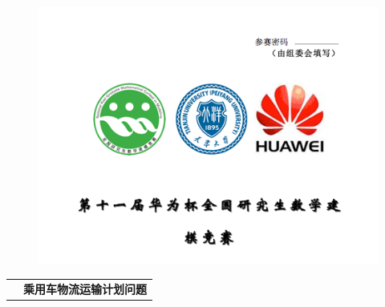 \documentclass[UTF8，12pt]{ctexart}
\begin{document}


% 

\pagebreak
\begin{figure}[t]
	\includegraphics[width=\linewidth]{figure/header.png}
\end{figure}


\begin{table}[h]
\centering
\begin{tabular}{c  c} 
		{\fontsize{14pt}{\baselineskip}\selectfont 	{题目}} & 
		{\fontsize{16pt}{\baselineskip}\selectfont \textbf{乘用车物流运输计划问题}} \\\cline{2-2}
\end{tabular}

\end{table}

\FloatBarrier
\end{document}

